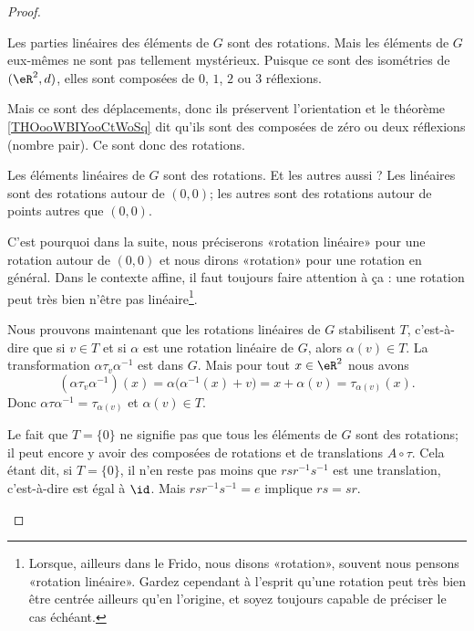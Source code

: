 \begin{proof}
\begin{subproof}

		Les parties linéaires des éléments de \( G\) sont des rotations. Mais les éléments de \( G\) eux-mêmes ne sont pas tellement mystérieux. Puisque ce sont des isométries de \( (\eR^2,d)\), elles sont composées de \( 0\), \( 1\), \( 2\) ou \( 3\) réflexions.

		Mais ce sont des déplacements, donc ils préservent l'orientation et le théorème \ref{THOooWBIYooCtWoSq} dit qu'ils sont des composées de zéro ou deux réflexions (nombre pair). Ce sont donc des rotations.

		\spitem[Hein ?]
		Les éléments linéaires de \( G\) sont des rotations. Et les autres aussi ? Les linéaires sont des rotations autour de \( (0,0)\); les autres sont des rotations autour de points autres que \( (0,0)\).

		C'est pourquoi dans la suite, nous préciserons «rotation linéaire» pour une rotation autour de \( (0,0)\) et nous dirons «rotation» pour une rotation en général. Dans le contexte affine, il faut toujours faire attention à ça : une rotation peut très bien n'être pas linéaire\footnote{Lorsque, ailleurs dans le Frido, nous disons «rotation», souvent nous pensons «rotation linéaire». Gardez cependant à l'esprit qu'une rotation peut très bien être centrée ailleurs qu'en l'origine, et soyez toujours capable de préciser le cas échéant.}.

		Nous prouvons maintenant que les rotations linéaires de \( G\) stabilisent \( T\), c'est-à-dire que si \( v\in T\) et si \( \alpha\) est une rotation linéaire de \( G\), alors \( \alpha(v)\in T\). La transformation \( \alpha\tau_v\alpha^{-1}\) est dans \( G\). Mais pour tout \( x\in \eR^2\) nous avons
		\begin{equation}        \label{EQooLLZVooUuabir}
			(\alpha\tau_v\alpha^{-1})(x)=\alpha\big( \alpha^{-1}(x)+v \big)=x+\alpha(v)=\tau_{\alpha(v)}(x).
		\end{equation}
		Donc \( \alpha\tau\alpha^{-1}=\tau_{\alpha(v)}\) et \( \alpha(v)\in T\).

		\spitem[Exclusion de \( T=\{ 0 \}\)]
		Le fait que \( T=\{ 0 \}\) ne signifie pas que tous les éléments de \( G\) sont des rotations; il peut encore y avoir des composées de rotations et de translations \( A\circ \tau\). Cela étant dit, si \( T=\{ 0 \}\), il n'en reste pas moins que \( rsr^{-1}s^{-1}\) est une translation, c'est-à-dire est égal à \( \id\). Mais \( rsr^{-1}s^{-1}=e\) implique \( rs=sr\).


\end{subproof}
\end{proof}
